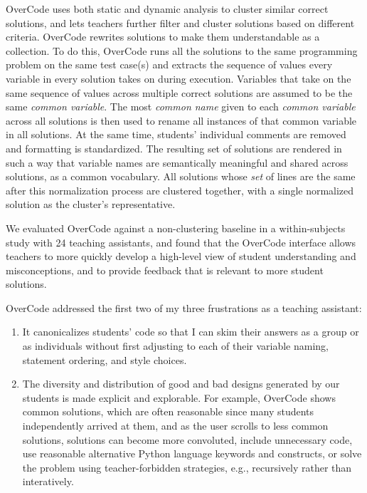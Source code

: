 OverCode uses both static and dynamic analysis to cluster similar correct solutions, and lets teachers further filter and cluster solutions based on different criteria. OverCode rewrites solutions to make them understandable as a collection. To do this, OverCode runs all the solutions to the same programming problem on the same test case(s) and extracts the sequence of values every variable in every solution takes on during execution. Variables that take on the same sequence of values across multiple correct solutions are assumed to be the same {\it common variable}. The most {\it common name} given to each {\it common variable} across all solutions is then used to rename all instances of that common variable in all solutions. At the same time, students' individual comments are removed and formatting is standardized. The resulting set of solutions are rendered in such a way that variable names are semantically meaningful and shared across solutions, as a common vocabulary. All solutions whose {\it set} of lines are the same after this normalization process are clustered together, with a single normalized solution as the cluster's representative.

We evaluated OverCode against a non-clustering baseline in a within-subjects study with 24 teaching assistants, and found that the OverCode interface allows teachers to more quickly develop a high-level view of student understanding and misconceptions, and to provide feedback that is relevant to more student solutions.

OverCode addressed the first two of my three frustrations as a teaching assistant:
\begin{enumerate}
\item It canonicalizes students' code so that I can skim their answers as a group or as individuals without first adjusting to each of their variable naming, statement ordering, and style choices.
\item The diversity and distribution of good and bad designs generated by our students is made explicit and explorable. For example, OverCode shows common solutions, which are often reasonable since many students independently arrived at them, and as the user scrolls to less common solutions, solutions can become more convoluted, include unnecessary code, use reasonable alternative Python language keywords and constructs, or solve the problem using teacher-forbidden strategies, e.g., recursively rather than interatively.
\end{enumerate}

